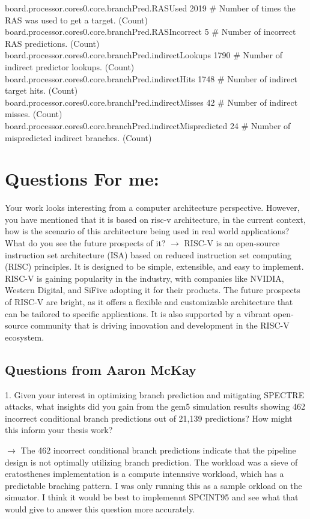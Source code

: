 board.processor.cores0.core.branchPred.RASUsed         2019 \# Number of times the RAS was used to get a target. (Count)\\
board.processor.cores0.core.branchPred.RASIncorrect     5 \# Number of incorrect RAS predictions. (Count)\\
board.processor.cores0.core.branchPred.indirectLookups  1790 \# Number of indirect predictor lookups. (Count)\\
board.processor.cores0.core.branchPred.indirectHits     1748 \# Number of indirect target hits. (Count)\\
board.processor.cores0.core.branchPred.indirectMisses    42 \# Number of indirect misses. (Count)\\
board.processor.cores0.core.branchPred.indirectMispredicted  24 \# Number of mispredicted indirect branches. (Count)\\

\section*{Questions For me: }
Your work looks interesting from a computer architecture perspective. However, you have mentioned that it is based on risc-v architecture, in the current context, how is the scenario of this architecture being used in real world applications? What do you see the future prospects of it?
$\longrightarrow$ RISC-V is an open-source instruction set architecture (ISA) based on reduced instruction set computing (RISC) principles. 
It is designed to be simple, extensible, and easy to implement. RISC-V is gaining popularity in the industry, with companies like NVIDIA, Western Digital, and SiFive adopting it for their products. 
The future prospects of RISC-V are bright, as it offers a flexible and customizable architecture that can be tailored to specific applications. 
It is also supported by a vibrant open-source community that is driving innovation and development in the RISC-V ecosystem.

\subsection{Questions from Aaron McKay}
1. Given your interest in optimizing branch prediction and mitigating SPECTRE attacks, what insights did you gain from the gem5 simulation results showing 462 incorrect conditional branch predictions out of 21,139 predictions? How might this inform your thesis work?

$\longrightarrow$ The 462 incorrect conditional branch predictions indicate that the pipeline design is not optimally utilizing branch prediction. The workload was a sieve of eratosthenes implementation is a compute intennsive workload, which has a predictable braching pattern. I was only running this as a sample orkload on the simuator. I think it would be best to implemennt SPCINT95 and see what that would give to answer this question more accurately.

